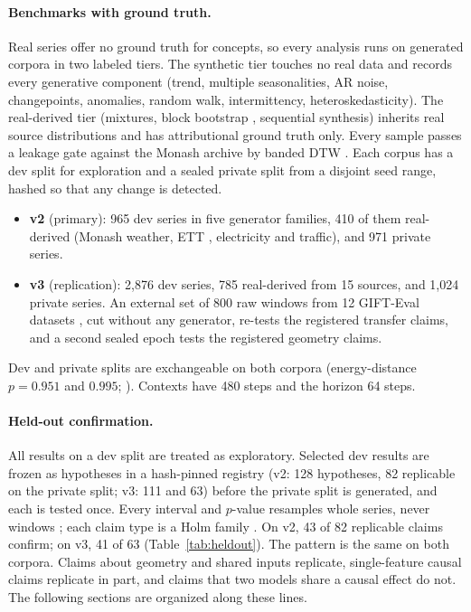 \paragraph{Benchmarks with ground truth.} Real series offer no ground truth for concepts, so every analysis runs on
generated corpora in two labeled tiers. The synthetic tier touches no real data and records every generative
component (trend, multiple seasonalities, AR noise, changepoints, anomalies, random walk, intermittency,
heteroskedasticity). The real-derived tier (mixtures, block bootstrap \citep{kunsch1989block}, sequential
synthesis) inherits real source distributions and has attributional ground truth only. Every sample passes a leakage gate
against the Monash archive \citep{godahewa2021monash} by banded DTW \citep{sakoe1978dtw}. Each corpus has a dev split for
exploration and a sealed private split from a disjoint seed range, hashed so that any change is detected.
\begin{itemize}
  \item \textbf{v2} (primary): 965 dev series in five generator families, 410 of them real-derived (Monash weather, ETT
    \citep{zhou2021informer}, electricity and traffic), and 971 private series.
  \item \textbf{v3} (replication): 2{,}876 dev series, 785 real-derived from 15 sources, and 1{,}024 private series. An
    external set of 800 raw windows from 12 GIFT-Eval datasets \citep{aksu2024gifteval}, cut without any
    generator, re-tests the registered transfer claims, and a second sealed epoch tests the registered geometry claims.
\end{itemize}
Dev and private splits are exchangeable on both corpora (energy-distance $p=0.951$ and $0.995$; ). Contexts
have 480 steps and the horizon 64 steps.

\paragraph{Held-out confirmation.} All results on a dev split are treated as exploratory. Selected dev results are
frozen as hypotheses in a hash-pinned registry (v2: 128 hypotheses, 82 replicable on the private split; v3: 111 and 63)
before the private split is generated, and each is tested once. Every interval and $p$-value resamples whole series,
never windows \citep{efron1993bootstrap,cameron2008cluster}; each claim type is a Holm family \citep{holm1979}. On v2, 43
of 82 replicable claims confirm; on v3, 41 of 63 (Table~\ref{tab:heldout}). The pattern is the same on both corpora. Claims
about geometry and shared inputs replicate, single-feature causal claims replicate in part, and claims that two models
share a causal effect do not. The following sections are organized along these lines.

